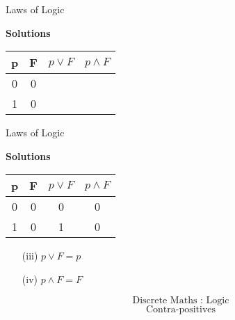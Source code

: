 \documentclass[12pt]{article}
\begin{document}

{Laws of Logic}

\textbf{Solutions}
\begin{center}

\begin{tabular}{|c|c||c|c|}
\hline  \phantom{sp}p\phantom{sp}&  \phantom{sp}F\phantom{sp}& $p \vee F$ & $ p \wedge F$ \\ \hline
\hline  0 & 0 &  &  \\ 
\hline  1 &  0 &  &  \\ 
\hline 
\end{tabular} 

\end{center}


{Laws of Logic}

\textbf{Solutions}
\begin{center}
\begin{tabular}{|c|c||c|c|}
\hline  \phantom{sp}p\phantom{sp}&  \phantom{sp}F\phantom{sp}& $p \vee F$ & $ p \wedge F$ \\ \hline
\hline  0 & 0 & 0 & 0 \\ 
\hline  1 &  0 & 1 & 0 \\ 
\hline 
\end{tabular} 

\end{center}
\begin{itemize}
\item[(iii)] $p \vee F = p $
\item[(iv)] $p \wedge F = F $
\end{itemize}

%
%
%



\[\mbox{Discrete Maths :  Logic}\]
\[\mbox{Contra-positives}\]
\bigskip
\end{document}
